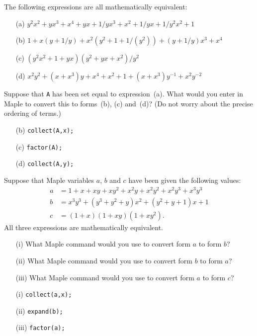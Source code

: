\documentclass[a4paper]{article}
\begin{document}
\begin{problem}\label{ex-algebra-ii}
 The following expressions are all mathematically equivalent:
 \begin{itemize}
  \item[(a)] $y^2x^2+yx^3+x^4+yx+1/yx^3+x^2+1/yx+1/y^2x^2+1$
  \item[(b)] $1+x(y+1/y)+x^2(y^2+1+1/(y^2))+(y+1/y)x^3+x^4$
  \item[(c)] $(y^2x^2+1+yx)(y^2+yx+x^2)/y^2$
  \item[(d)] $x^2y^2+(x+x^3)y+x^4+x^2+1+(x+x^3)y^{-1}+x^2y^{-2}$
 \end{itemize}
 Suppose that \verb~A~ has been set equal to
 expression~(a).  What would you enter in Maple to convert
 this to forms~(b), (c) and~(d)?  (Do not worry about the
 precise ordering of terms.)  
\end{problem}
\begin{solution}
 \begin{itemize}
  \item[(b)] \verb~collect(A,x);~  \hspace{2em}\mk
  \item[(c)] \verb~factor(A);~     \hspace{2em}\mk
  \item[(d)] \verb~collect(A,y);~  \hspace{2em}\mk
 \end{itemize}
\end{solution}

\begin{problem}\label{ex-algebra-iii}
 Suppose that Maple variables $a$, $b$ and $c$ have been
 given the following values:
 \begin{align*}
  a &= 1+x+xy+xy^2+x^2y+x^2y^2+x^2y^3+x^3y^3 \\
  b &= x^3y^3 + (y^3+y^2+y)x^2 + (y^2+y+1)x + 1 \\
  c &= (1+x)(1+xy)(1+xy^2).
 \end{align*}
 All three expressions are mathematically equivalent.
 \begin{itemize}
  \item[(i)] What Maple command would you use to convert
   form $a$ to form $b$? 
  \item[(ii)] What Maple command would you use to convert
   form $b$ to form $a$? 
  \item[(iii)] What Maple command would you use to convert
   form $a$ to form $c$? 
 \end{itemize}
\end{problem}
\begin{solution}
 \begin{itemize}
  \item[(i)] \verb~collect(a,x);~  \hspace{2em}
  \item[(ii)] \verb~expand(b);~    \hspace{2em}
  \item[(iii)] \verb~factor(a);~   \hspace{2em}
 \end{itemize}
\end{solution}
\end{document}
